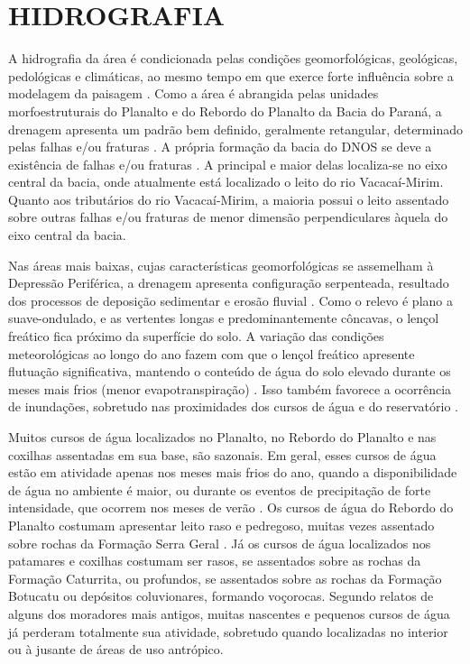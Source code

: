\section{HIDROGRAFIA}
\label{sec:chap03-hidrografia}

A hidrografia da área é condicionada pelas condições geomorfológicas, geológicas, pedológicas e climáticas, ao 
mesmo tempo em que exerce forte influência sobre a modelagem da paisagem \cite{NascimentoEtAl2010}. Como a área 
é 
abrangida pelas unidades morfoestruturais do Planalto e do Rebordo do Planalto da Bacia do Paraná, a drenagem 
apresenta um padrão bem definido, geralmente retangular, determinado pelas falhas e/ou fraturas 
\cite{Bortoluzzi1974, GasparettoEtAl1988, NascimentoEtAl2010}. A própria formação da bacia do DNOS se deve 
a existência de falhas e/ou fraturas \cite{GasparettoEtAl1988}. A principal e maior delas localiza-se no eixo 
central da bacia, onde atualmente está localizado o leito do rio Vacacaí-Mirim. Quanto aos tributários do rio 
Vacacaí-Mirim, a maioria possui o leito assentado sobre outras falhas e/ou fraturas de menor dimensão 
perpendiculares àquela do eixo central da bacia.

Nas áreas mais baixas, cujas características geomorfológicas se assemelham à Depressão Periférica, a drenagem 
apresenta configuração serpenteada, resultado dos processos de deposição sedimentar e erosão fluvial 
\cite{PaivaEtAl2001, SutiliEtAl2009}. Como o relevo é plano a suave-ondulado, e as vertentes longas e 
predominantemente côncavas, o lençol freático fica próximo da superfície do solo. A variação das condições 
meteorológicas ao longo do ano fazem com que o lençol freático apresente flutuação significativa, mantendo o 
conteúdo de água do solo elevado durante os meses mais frios (menor evapotranspiração) \cite{HeldweinEtAl2009}.
Isso também favorece a ocorrência de inundações, sobretudo nas proximidades dos cursos de água e do 
reservatório \cite{Goldani2006}.

Muitos cursos de água localizados no Planalto, no Rebordo do Planalto e nas coxilhas assentadas em sua base, 
são sazonais. Em geral, esses cursos de água estão em atividade apenas nos meses mais frios do ano, quando a 
disponibilidade de água no ambiente é maior, ou durante os eventos de precipitação de forte intensidade, que 
ocorrem nos meses de verão \cite{HeldweinEtAl2009, MouraBueno2012}. Os cursos de água do Rebordo do Planalto 
costumam apresentar leito raso e pedregoso, muitas vezes assentado sobre rochas da Formação Serra Geral 
\cite{SutiliEtAl2009}. Já os cursos de água localizados nos patamares e coxilhas costumam ser rasos, se 
assentados sobre as rochas da Formação Caturrita, ou profundos, se assentados sobre as rochas da Formação 
Botucatu ou depósitos coluvionares, formando voçorocas. Segundo relatos de alguns dos moradores mais antigos, 
muitas nascentes e pequenos cursos de água já perderam totalmente sua atividade, sobretudo quando localizadas 
no interior ou à jusante de áreas de uso antrópico.

